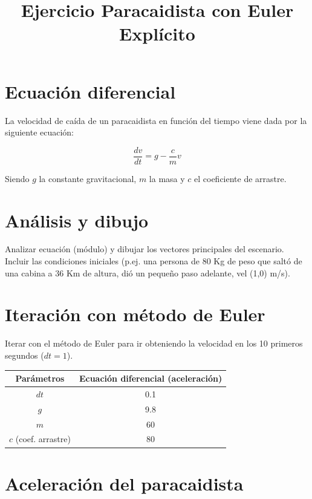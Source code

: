 \documentclass{article}
\title{Ejercicio Paracaidista con Euler Explícito}
\author{}
\date{}
\begin{document}
\maketitle

\section{Ecuación diferencial}

La velocidad de caída de un paracaidista en función del tiempo viene dada por la siguiente ecuación:

\[
\frac{dv}{dt} = g - \frac{c}{m}v
\]

Siendo \( g \) la constante gravitacional, \( m \) la masa y \( c \) el coeficiente de arrastre.

\section{Análisis y dibujo}

Analizar ecuación (módulo) y dibujar los vectores principales del escenario. Incluir las condiciones iniciales (p.ej. una persona de 80 Kg de peso que saltó de una cabina a 36 Km de altura, dió un pequeño paso adelante, vel (1,0) m/s).

\section{Iteración con método de Euler}

Iterar con el método de Euler para ir obteniendo la velocidad en los 10 primeros segundos (\( dt = 1 \)).

\begin{table}[htbp]
    \centering
    \begin{tabular}{|c|c|}
    \hline
    \textbf{Parámetros} & \textbf{Ecuación diferencial (aceleración)} \\ \hline
    \( dt \) & 0.1 \\ \hline
    \( g \) & 9.8 \\ \hline
    \( m \) & 60 \\ \hline
    \( c \) (coef. arrastre) & 80 \\ \hline
    \end{tabular}
\end{table}

\section{Aceleración del paracaidista}
\end{document}
